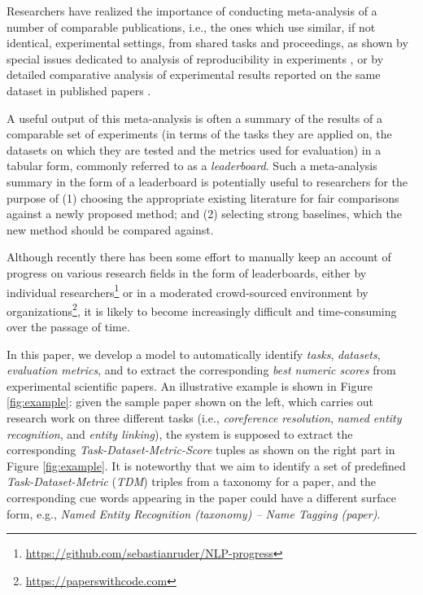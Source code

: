 \documentclass[11pt,a4paper]{article}
\begin{document}
Researchers have realized the importance of conducting meta-analysis of a number of comparable publications, i.e., the ones which use similar, if not identical, experimental settings, from shared tasks and proceedings, as shown by special issues dedicated to analysis of reproducibility in experiments \cite{Ferro:2018}, or by detailed comparative analysis of experimental results reported on the same dataset in published papers \cite{ArmstrongMWZ09}.

A useful output of this meta-analysis is often a summary of the results of a comparable set of experiments (in terms of the tasks they are applied on, the datasets on which they are tested and the metrics used for evaluation) in a tabular form, commonly referred to as a \emph{leaderboard}.
Such a meta-analysis summary in the form of a leaderboard is potentially useful to researchers for the purpose of (1) choosing the appropriate existing literature for fair comparisons against a newly proposed method; and (2) selecting strong baselines, which the new method should be compared against. 

Although recently there has been some effort to manually keep an account of progress on various research fields in the form of leaderboards,  either by individual researchers\footnote{\url{https://github.com/sebastianruder/NLP-progress}} or in a moderated crowd-sourced environment by organizations\footnote{\url{https://paperswithcode.com}}, it is likely to become increasingly difficult and time-consuming over the passage of time.

In this paper, we develop a model to automatically identify 
\emph{tasks}, \emph{datasets}, \emph{evaluation metrics}, and to extract the corresponding \emph{best numeric scores} from experimental scientific papers. An illustrative example is shown in Figure \ref{fig:example}: given the sample paper shown on the left, which carries out research work on three different tasks (i.e., \emph{coreference resolution}, \emph{named entity recognition}, and \emph{entity linking}), the system is supposed to extract the corresponding \emph{Task-Dataset-Metric-Score} tuples as shown on the right part in Figure \ref{fig:example}. 
It is noteworthy that we aim to identify a set of predefined \emph{Task-Dataset-Metric} (\emph{TDM}) triples from a taxonomy for a paper, and the corresponding cue words appearing in the paper could have a different surface form, e.g., \emph{Named Entity Recognition (taxonomy) -- Name Tagging (paper)}. 
\end{document}
